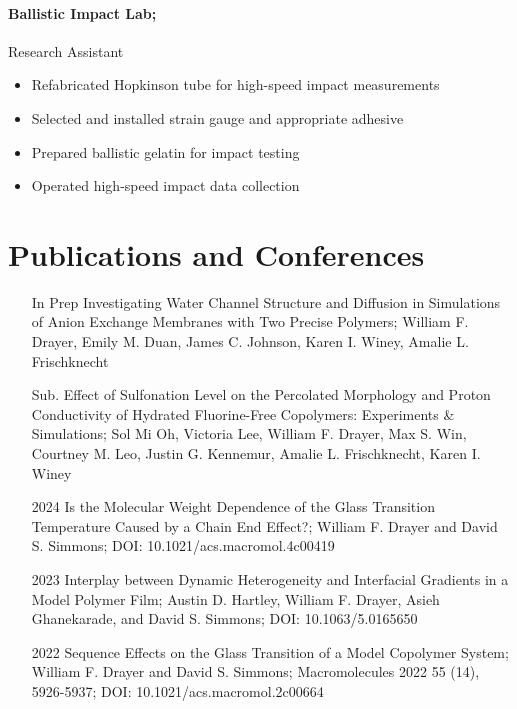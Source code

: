 \documentclass{my_cv}
\begin{document}
\paragraph{Ballistic Impact Lab;}
Research Assistant
\begin{itemize}
    \item Re\-fabricated Hopkins\-on tube for high-speed impact measurements
    \item Selected and installed strain gauge and appropriate adhesive
    \item Prepared ballistic gelatin for impact testing
    \item Operated high-speed impact data collection
\end{itemize}

\section{Publications and Conferences}
\begin{itemize}
    \item[In Prep] Investigating Water Channel Structure and Diffusion in Simulations of Anion Exchange Membranes with Two Precise Polymers; 
    William F. Drayer, Emily M. Duan, James C. Johnson, Karen I. Winey, Amalie L. Frischknecht
    \item[Sub.] Effect of Sulfonation Level on the Percolated Morphology and Proton Conductivity of Hydrated Fluorine-Free Copolymers: 
    Experiments \& Simulations; 
    Sol Mi Oh, Victoria Lee, William F. Drayer, Max S. Win, Courtney M. Leo, Justin G. Kennemur, Amalie L. Frischknecht, Karen I. Winey
    \item[2024] Is the Molecular Weight Dependence of the Glass Transition Temperature Caused by a Chain End Effect?; 
    William F. Drayer and David S. Simmons; DOI: 10.1021/acs.macromol.4c00419
    \item[2023] Interplay between Dynamic Heterogeneity and Inter\-facial Gradients in a Model Polymer Film; 
    Austin D. Hartley, William F. Drayer, Asieh Ghanekarade, and David S. Simmons; DOI: 10.1063/5.0165650
    \item[2022] Sequence Effects on the Glass Transition of a Model Co\-polymer System; 
    William F. Drayer and David S. Simmons; Macromolecules 2022 55 (14), 5926-5937; DOI: 10.1021/acs.macromol.2c00664
\end{itemize}
\end{document}
